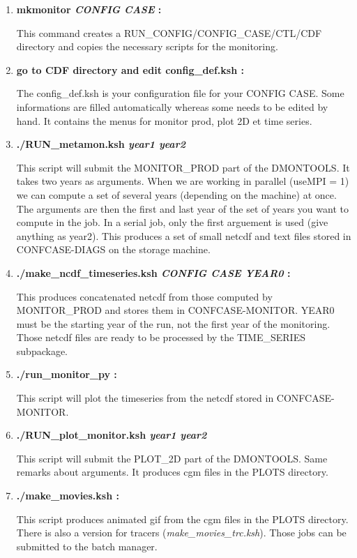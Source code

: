 \documentclass[a4paper,11pt]{article}
\begin{document}
\begin{enumerate}
\item \textbf{mkmonitor \textit{CONFIG CASE} :}

This command creates a RUN\_CONFIG/CONFIG\_CASE/CTL/CDF directory and copies the necessary
scripts for the monitoring.

\item \textbf{go to CDF directory and edit config\_def.ksh :}

The config\_def.ksh is your configuration file for your CONFIG CASE. Some informations are
filled automatically whereas some needs to be edited by hand. It contains the menus for monitor prod,
plot 2D et time series.

\item \textbf{./RUN\_metamon.ksh \textit{year1 year2}}

This script will submit the MONITOR\_PROD part of the DMONTOOLS. It takes two years as arguments. When we are working in parallel
(useMPI = 1) we can compute a set of several years (depending on the machine) at once. The arguments are then the first and last year
of the set of years you want to compute in the job. In a serial job, only the first arguement is used (give anything as year2).
This produces a set of small netcdf and text files stored in CONFCASE-DIAGS on the storage machine.

\item \textbf{./make\_ncdf\_timeseries.ksh \textit{CONFIG CASE YEAR0} :}

This produces concatenated netcdf from those computed by MONITOR\_PROD and stores them in CONFCASE-MONITOR. 
YEAR0 must be the starting year of the run, not the first year of the monitoring.
Those netcdf files are ready to be processed by the TIME\_SERIES subpackage.

\item \textbf{./run\_monitor\_py :}

This script will plot the timeseries from the netcdf stored in CONFCASE-MONITOR. 

\item \textbf{./RUN\_plot\_monitor.ksh \textit{year1 year2}}

This script will submit the PLOT\_2D part of the DMONTOOLS. Same remarks about arguments.
It produces cgm files in the PLOTS directory.

\item \textbf{./make\_movies.ksh :}

This script produces animated gif from the cgm files in the PLOTS directory. There is also a version for tracers
(\textit{make\_movies\_trc.ksh}). Those jobs can be submitted to the batch manager.

\end{enumerate}
\end{document}
